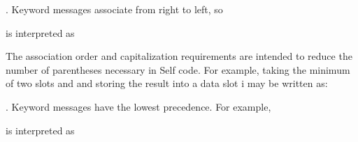 \documentclass[letterpaper,10pt,english]{sphinxmanual}
\begin{document}
. Keyword messages associate from right to left, so

\begin{sphinxVerbatim}[commandchars=\\\{\}]
            
\end{sphinxVerbatim}

is interpreted as

\begin{sphinxVerbatim}[commandchars=\\\{\}]
            
\end{sphinxVerbatim}

The association order and capitalization requirements are intended to reduce the number of parentheses necessary in Self code. For example, taking the minimum of two slots  and  and storing the result into a data slot i may be written as:

\begin{sphinxVerbatim}[commandchars=\\\{\}]
   
\end{sphinxVerbatim}

. Keyword messages have the lowest precedence. For example,

\begin{sphinxVerbatim}[commandchars=\\\{\}]
     
\end{sphinxVerbatim}

is interpreted as

\begin{sphinxVerbatim}[commandchars=\\\{\}]
     
\end{sphinxVerbatim}
\end{document}
